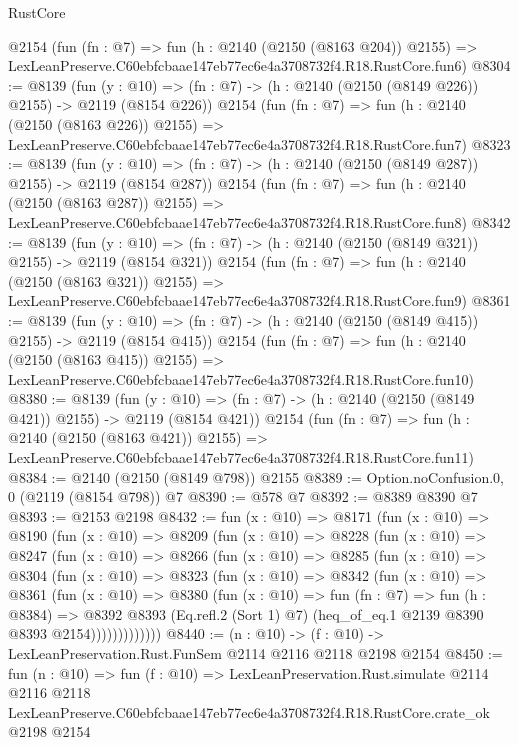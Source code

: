 \begin{lexlean}{RustCore}
\begin{coremodule}
    @2154
    (fun (fn : @7) =>
    fun (h : @2140 (@2150 (@8163 @204)) @2155) =>
    LexLeanPreserve.C60ebfcbaae147eb77ec6e4a3708732f4.R18.RustCore.fun6)
@8304 := @8139
    (fun (y : @10) => (fn : @7) -> (h : @2140 (@2150 (@8149 @226)) @2155) -> @2119 (@8154 @226))
    @2154
    (fun (fn : @7) =>
    fun (h : @2140 (@2150 (@8163 @226)) @2155) =>
    LexLeanPreserve.C60ebfcbaae147eb77ec6e4a3708732f4.R18.RustCore.fun7)
@8323 := @8139
    (fun (y : @10) => (fn : @7) -> (h : @2140 (@2150 (@8149 @287)) @2155) -> @2119 (@8154 @287))
    @2154
    (fun (fn : @7) =>
    fun (h : @2140 (@2150 (@8163 @287)) @2155) =>
    LexLeanPreserve.C60ebfcbaae147eb77ec6e4a3708732f4.R18.RustCore.fun8)
@8342 := @8139
    (fun (y : @10) => (fn : @7) -> (h : @2140 (@2150 (@8149 @321)) @2155) -> @2119 (@8154 @321))
    @2154
    (fun (fn : @7) =>
    fun (h : @2140 (@2150 (@8163 @321)) @2155) =>
    LexLeanPreserve.C60ebfcbaae147eb77ec6e4a3708732f4.R18.RustCore.fun9)
@8361 := @8139
    (fun (y : @10) => (fn : @7) -> (h : @2140 (@2150 (@8149 @415)) @2155) -> @2119 (@8154 @415))
    @2154
    (fun (fn : @7) =>
    fun (h : @2140 (@2150 (@8163 @415)) @2155) =>
    LexLeanPreserve.C60ebfcbaae147eb77ec6e4a3708732f4.R18.RustCore.fun10)
@8380 := @8139
    (fun (y : @10) => (fn : @7) -> (h : @2140 (@2150 (@8149 @421)) @2155) -> @2119 (@8154 @421))
    @2154
    (fun (fn : @7) =>
    fun (h : @2140 (@2150 (@8163 @421)) @2155) =>
    LexLeanPreserve.C60ebfcbaae147eb77ec6e4a3708732f4.R18.RustCore.fun11)
@8384 := @2140 (@2150 (@8149 @798)) @2155
@8389 := Option.noConfusion.{0, 0} (@2119 (@8154 @798)) @7
@8390 := @578 @7
@8392 := @8389 @8390 @7
@8393 := @2153 @2198
@8432 := fun (x : @10) =>
  @8171
    (fun (x : @10) =>
    @8190
      (fun (x : @10) =>
      @8209
        (fun (x : @10) =>
        @8228
          (fun (x : @10) =>
          @8247
            (fun (x : @10) =>
            @8266
              (fun (x : @10) =>
              @8285
                (fun (x : @10) =>
                @8304
                  (fun (x : @10) =>
                  @8323
                    (fun (x : @10) =>
                    @8342
                      (fun (x : @10) =>
                      @8361
                        (fun (x : @10) =>
                        @8380
                          (fun (x : @10) =>
                          fun (fn : @7) =>
                          fun (h : @8384) =>
                          @8392
                            @8393
                            (Eq.refl.{2} (Sort 1) @7)
                            (heq_of_eq.{1} @2139 @8390 @8393 @2154)))))))))))))
@8440 := (n : @10) -> (f : @10) -> LexLeanPreservation.Rust.FunSem @2114 @2116 @2118 @2198 @2154
@8450 := fun (n : @10) =>
  fun (f : @10) =>
  LexLeanPreservation.Rust.simulate
    @2114
    @2116
    @2118
    LexLeanPreserve.C60ebfcbaae147eb77ec6e4a3708732f4.R18.RustCore.crate_ok
    @2198
    @2154
\end{coremodule}
\end{lexlean}
